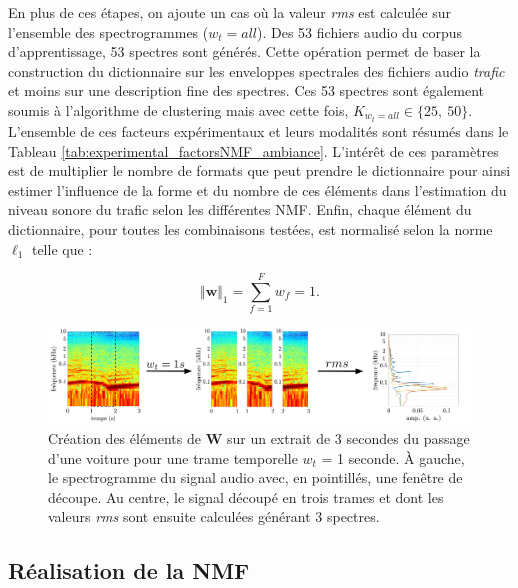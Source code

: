 En plus de ces étapes, on ajoute un cas où la valeur \textit{rms} est calculée sur l'ensemble des spectrogrammes ($w_t = all$). Des 53 fichiers audio du corpus d'apprentissage, 53 spectres sont générés. Cette opération permet de baser la construction du dictionnaire sur les enveloppes spectrales des fichiers audio \textit{trafic} et moins sur une description fine des spectres. Ces 53 spectres sont également soumis à l'algorithme de clustering mais avec cette fois, $K_{w_t = all} \in \lbrace 25,~ 50 \rbrace$.
L'ensemble de ces facteurs expérimentaux et leurs modalités sont résumés dans le Tableau \ref{tab:experimental_factorsNMF_ambiance}. L'intérêt de ces paramètres est de multiplier le nombre de formats que peut prendre le dictionnaire pour ainsi estimer l'influence de la forme et du nombre de ces éléments dans l'estimation du niveau sonore du trafic selon les différentes NMF. Enfin, chaque élément du dictionnaire, pour toutes les combinaisons testées, est normalisé selon la norme $\ell_1$ telle que : 

\begin{equation}
\Vert \mathbf{w} \Vert_1 = \sum_{f = 1}^{F} w_f =  1.
\end{equation}

\begin{figure}[hbtp]
\centering
\includegraphics[width=\linewidth]{./figures/NMF/dictionaire_frame_FR.pdf}
\caption{Création des éléments de $\mathbf{W}$ sur un extrait de 3 secondes du passage d'une voiture pour une trame temporelle $w_t$ = 1 seconde. À gauche, le spectrogramme du signal audio avec, en pointillés, une fenêtre de découpe. Au centre, le signal découpé en trois trames et dont les valeurs \textit{rms} sont ensuite calculées générant 3 spectres.}
\label{fig:decoupe_W}
\end{figure}

\subsection{Réalisation de la NMF}

